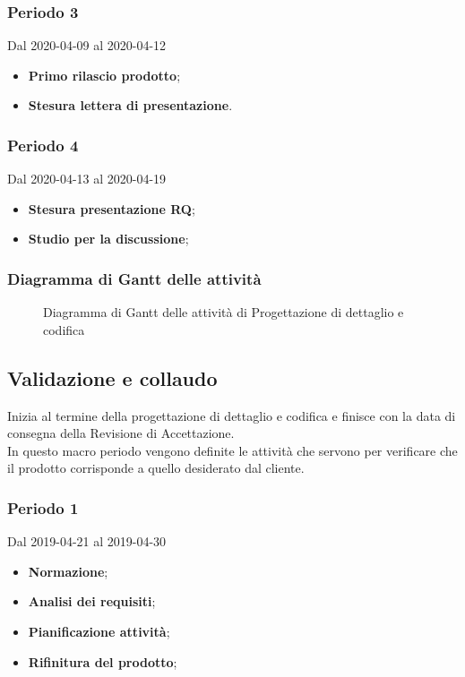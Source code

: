 \subsubsection{Periodo 3}
Dal 2020-04-09 al 2020-04-12\\
\begin{itemize}
	\item \textbf{Primo rilascio prodotto};
	\item \textbf{Stesura lettera di presentazione}.
\end{itemize}
\subsubsection{Periodo 4} 
Dal 2020-04-13 al 2020-04-19\\
\begin{itemize}
	\item \textbf{Stesura presentazione RQ};
	\item \textbf{Studio per la discussione};
\end{itemize}
\subsubsection{Diagramma di Gantt delle attività}
\begin{figure}[h]
	\caption{Diagramma di Gantt delle attività di Progettazione di dettaglio e codifica}
\end{figure}


\subsection{Validazione e collaudo}
Inizia al termine della progettazione di dettaglio e codifica e finisce con la data di consegna della Revisione di Accettazione.
\\In questo macro periodo vengono definite le attività che servono per verificare che il prodotto corrisponde a quello desiderato dal cliente.
\subsubsection{Periodo 1} 
Dal 2019-04-21 al 2019-04-30
\begin{itemize}
	\item \textbf{Normazione};
	\item \textbf{Analisi dei requisiti};
	\item \textbf{Pianificazione attività};
	\item \textbf{Rifinitura del prodotto};
\end{itemize}
